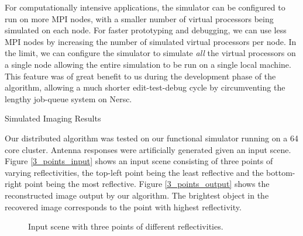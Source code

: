 \documentclass[twocolumn]{article}
\makeatletter
\def\section{\@startsection{section}{1}{\z@}{24pt plus 2 pt
minus 2 pt} {12pt plus 2pt minus 2pt}{\large\bf}}
\makeatother
\begin{document}
For computationally intensive applications, the simulator can be configured to run on more MPI nodes, with a smaller number of virtual processors being simulated on each node. For faster prototyping and debugging, we can use less MPI nodes by increasing the number of simulated virtual processors per node. In the limit, we can configure the simulator to simulate {\em all} the virtual processors on a single node allowing the entire simulation to be run on a single local machine. This feature was of great benefit to us during the development phase of the algorithm, allowing a much shorter edit-test-debug cycle by circumventing the lengthy job-queue system on Nersc. 

\section{Simulated Imaging Results}

Our distributed algorithm was tested on our functional simulator running on a 64 core cluster. Antenna responses were artificially generated given an input scene. Figure \ref{3_points_input} shows an input scene consisting of three points of varying reflectivities, the top-left point being the least reflective and the bottom-right point being the most reflective. Figure \ref{3_points_output} shows the reconstructed image output by our algorithm. The brightest object in the recovered image corresponds to the point with highest reflectivity. 

\begin{figure}
\begin{centering}

	
\end{centering}
\caption{Input scene with three points of different reflectivities.}
\end{figure}
\end{document}
